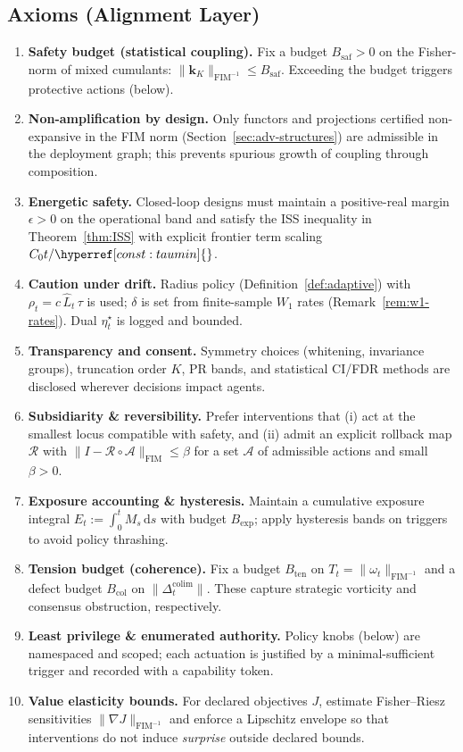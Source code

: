 \documentclass[10pt]{article}
\newcommand{\FIM}{\mathrm{FIM}}
\newcommand{\constref}[1]{%
  \hyperref[const:#1]{\ensuremath{\csname constsym#1\endcsname}}%
}
\begin{document}
\subsection*{Axioms (Alignment Layer)}
\begin{enumerate}[leftmargin=*]
  \item \textbf{Safety budget (statistical coupling).} Fix a budget $B_{\mathrm{saf}}>0$ on the Fisher-norm of mixed cumulants: $\|\mathbf k_K\|_{\FIM^{-1}}\le B_{\mathrm{saf}}$. Exceeding the budget triggers protective actions (below).
  \item \textbf{Non-amplification by design.} Only functors and projections certified non-expansive in the FIM norm (Section~\ref{sec:adv-structures}) are admissible in the deployment graph; this prevents spurious growth of coupling through composition.
  \item \textbf{Energetic safety.} Closed-loop designs must maintain a positive-real margin $\epsilon>0$ on the operational band and satisfy the ISS inequality in Theorem~\ref{thm:ISS} with explicit frontier term scaling $C_0 t/\constref{taumin}$.
  \item \textbf{Caution under drift.} Radius policy (Definition~\ref{def:adaptive}) with $\rho_t=c\,\widehat L_t\,\tau$ is used; $\delta$ is set from finite-sample $W_1$ rates (Remark~\ref{rem:w1-rates}). Dual $\eta^\star_t$ is logged and bounded.
  \item \textbf{Transparency and consent.} Symmetry choices (whitening, invariance groups), truncation order $K$, PR bands, and statistical CI/FDR methods are disclosed wherever decisions impact agents.
  \item \textbf{Subsidiarity \& reversibility.} Prefer interventions that (i) act at the smallest locus compatible with safety, and (ii) admit an explicit rollback map $\mathcal R$ with $\|I-\mathcal R\circ\mathcal A\|_{\FIM}\le \beta$ for a set $\mathcal A$ of admissible actions and small $\beta>0$.
  \item \textbf{Exposure accounting \& hysteresis.} Maintain a cumulative exposure integral $E_t:=\int_0^t M_s\,\mathrm ds$ with budget $B_{\mathrm{exp}}$; apply hysteresis bands on triggers to avoid policy thrashing.
  \item \textbf{Tension budget (coherence).} Fix a budget $B_{\mathrm{ten}}$ on $T_t=\|\omega_t\|_{\FIM^{-1}}$ and a defect budget $B_{\mathrm{col}}$ on $\|\Delta^{\mathrm{colim}}_t\|$. These capture strategic vorticity and consensus obstruction, respectively.
  \item \textbf{Least privilege \& enumerated authority.} Policy knobs (below) are namespaced and scoped; each actuation is justified by a minimal-sufficient trigger and recorded with a capability token.
  \item \textbf{Value elasticity bounds.} For declared objectives $J$, estimate Fisher–Riesz sensitivities $\|\nabla J\|_{\FIM^{-1}}$ and enforce a Lipschitz envelope so that interventions do not induce \emph{surprise} outside declared bounds.
\end{enumerate}
\end{document}
